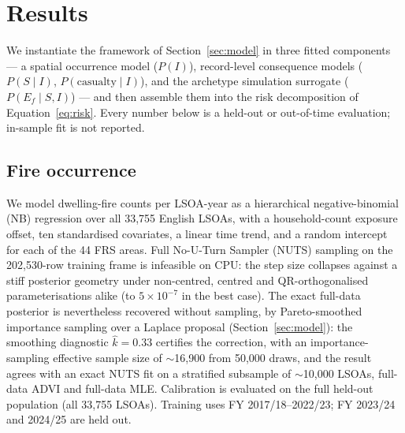\section{Results}
\label{sec:results}

We instantiate the framework of Section~\ref{sec:model} in three fitted
components --- a spatial occurrence model ($P(I)$), record-level consequence
models ($P(S\mid I)$, $P(\text{casualty}\mid I)$), and the archetype simulation
surrogate ($P(E_f\mid S,I)$) --- and then assemble them into the risk
decomposition of Equation~\eqref{eq:risk}. Every number below is a held-out or
out-of-time evaluation; in-sample fit is not reported.

\subsection{Fire occurrence}
\label{sec:results-occurrence}

We model dwelling-fire counts per LSOA-year as a hierarchical negative-binomial
(NB) regression over all 33{,}755 English LSOAs, with a household-count exposure
offset, ten standardised covariates, a linear time trend, and a random intercept
for each of the 44 FRS areas. Full No-U-Turn Sampler (NUTS) sampling on the
202{,}530-row training frame is infeasible on CPU: the step size collapses
against a stiff posterior geometry under non-centred, centred and
QR-orthogonalised parameterisations alike (to $5\times10^{-7}$ in the best
case). The exact full-data posterior is nevertheless recovered without
sampling, by Pareto-smoothed importance sampling over a Laplace proposal
(Section~\ref{sec:model}): the smoothing diagnostic $\hat{k}=0.33$ certifies
the correction, with an importance-sampling effective sample size of
$\sim$16{,}900 from 50{,}000 draws, and the result agrees with an exact NUTS
fit on a stratified subsample of $\sim$10{,}000 LSOAs, full-data ADVI and
full-data MLE. Calibration is evaluated on the full held-out
population (all 33{,}755 LSOAs). Training uses FY 2017/18--2022/23; FY 2023/24
and 2024/25 are held out.

